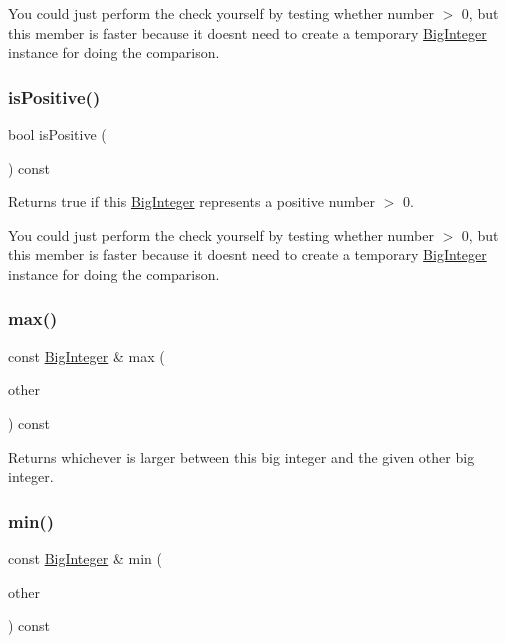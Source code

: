 You could just perform the check yourself by testing whether number $>$ 0, but this member is faster because it doesn\textquotesingle{}t need to create a temporary \mbox{\hyperlink{classBigInteger}{Big\+Integer}} instance for doing the comparison. \mbox{\label{classBigInteger_acaa49d84bd269a22c83b15966a483572}} 
\subsubsection{\texorpdfstring{is\+Positive()}{isPositive()}}
{\footnotesize\ttfamily bool is\+Positive (\begin{DoxyParamCaption}{ }\end{DoxyParamCaption}) const}



Returns true if this \mbox{\hyperlink{classBigInteger}{Big\+Integer}} represents a positive number $>$ 0. 

You could just perform the check yourself by testing whether number $>$ 0, but this member is faster because it doesn\textquotesingle{}t need to create a temporary \mbox{\hyperlink{classBigInteger}{Big\+Integer}} instance for doing the comparison. \mbox{\label{classBigInteger_a6d3e8559ebe8a6f0c8bebc756f4dd479}} 
\subsubsection{\texorpdfstring{max()}{max()}}
{\footnotesize\ttfamily const \mbox{\hyperlink{classBigInteger}{Big\+Integer}} \& max (\begin{DoxyParamCaption}\item[{const \mbox{\hyperlink{classBigInteger}{Big\+Integer}} \&}]{other }\end{DoxyParamCaption}) const}



Returns whichever is larger between this big integer and the given other big integer. 

\mbox{\label{classBigInteger_ae62de36198a0dcb836fd8680e7d71c64}} 
\subsubsection{\texorpdfstring{min()}{min()}}
{\footnotesize\ttfamily const \mbox{\hyperlink{classBigInteger}{Big\+Integer}} \& min (\begin{DoxyParamCaption}\item[{const \mbox{\hyperlink{classBigInteger}{Big\+Integer}} \&}]{other }\end{DoxyParamCaption}) const}



